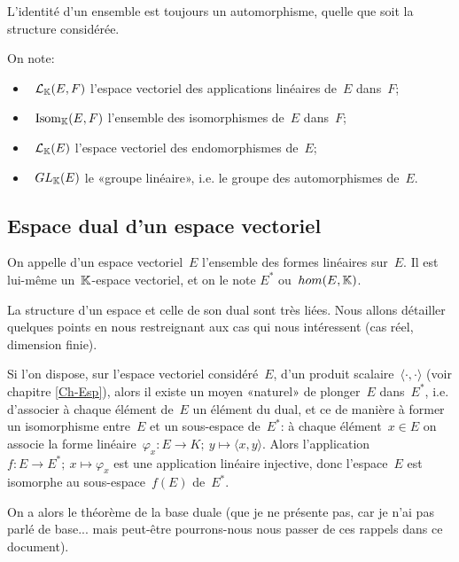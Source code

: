 \medskip
L'identité d'un ensemble est toujours un automorphisme, quelle que soit la structure considérée.

\medskip
On note:
\begin{itemize}
  \item~$\mathcal{L}_{\mathbb K}(E,F)$ l'espace vectoriel des applications linéaires de~$E$ dans~$F$;
  \item~$\operatorname{Isom}_{\mathbb K}(E,F)$ l'ensemble des isomorphismes de~$E$ dans~$F$;
  \item~$\mathcal{L}_{\mathbb K}(E)$ l'espace vectoriel des endomorphismes de~$E$;
  \item~$GL_{\mathbb K}(E)$ le «groupe linéaire», i.e. le groupe des automorphismes de~$E$.
\end{itemize}

\medskip
\subsection{Espace dual d'un espace vectoriel}

\begin{definition}
On appelle  d'un espace vectoriel~$E$ l'ensemble des formes linéaires sur~$E$. Il est lui-même un~$\mathbb K$-espace vectoriel, et on le note $E^*$ ou~$hom(E,\mathbb K)$.
\end{definition}

La structure d'un espace et celle de son dual sont très liées.
Nous allons détailler quelques points en nous restreignant aux cas qui nous intéressent (cas réel, dimension finie).

\begin{remarque}
Si l'on dispose, sur l'espace vectoriel considéré~$E$, d'un produit scalaire~$\langle\cdot,\cdot\rangle$ (voir chapitre \ref{Ch-Esp}), alors il existe un moyen «naturel» de plonger~$E$ dans~$E^*$, i.e. d'associer à chaque élément de~$E$ un élément du dual, et ce de manière à former un isomorphisme entre~$E$ et un sous-espace de~$E^*$:
à chaque élément~$x\in E$ on associe la forme linéaire~$\varphi_x: E \to K;\ y \mapsto \langle x,y\rangle$.
Alors l'application~$f: E \to E^*;\ x \mapsto \varphi_x$ est une application linéaire injective, donc l'espace~$E$ est isomorphe au sous-espace~$f(E)$ de~$E^*$.
\end{remarque}

{}
On a alors le théorème de la base duale (que je ne présente pas, car je n'ai pas parlé de base... mais peut-être pourrons-nous nous passer de ces rappels dans ce document).

